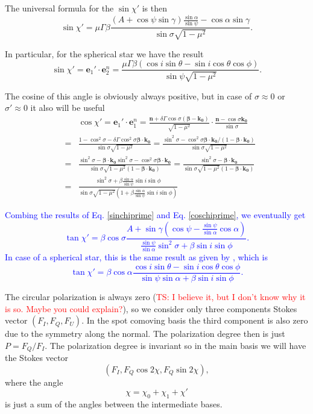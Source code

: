 \documentclass{aa}
\newcommand{\be}{\begin{equation}}
\newcommand{\ee}{\end{equation}}
\def\beq{\begin{eqnarray}}
\def\eeq{\end{eqnarray}}
\newcommand{\red}[1]{\textcolor{red}{#1}}
\newcommand{\blue}[1]{\textcolor{blue}{#1}}
\begin{document}
The universal formula for the $\sin\chi'$ is then 
\be\label{sinchiprime}
\sin\chi'={\mu\Gamma\beta }\frac{(A+\cos\psi \sin\gamma)\frac{\sin\alpha}{\sin\psi} - \cos \alpha\sin\gamma}{\sin{\sigma}\sqrt{1-\mu^2} }.
\ee
      
In particular, for the spherical star we have the result 
\be\label{chiprimespherical}
\sin{\chi'}=\bm{e}_1'\cdot \bm{e}_2^n =
\frac{\mu\Gamma\beta (\cos i \sin \theta - \sin i \cos \theta \cos \phi)}{\sin{\psi}\sqrt{1-\mu^2} }.
\ee

The cosine of this angle is obviously always positive, but in case of $\sigma\approx0$ or $ \sigma'\approx0$ it also will be useful  
\beq\label{coschiprime}
&&\cos\chi'=\bm{e}_1'\cdot \bm{e}_1^n =\frac{\bm n + \delta  \Gamma \cos\sigma (\bm \beta - \bm{k_0} ) }{\sqrt{1-\mu^2} }\cdot 
\frac{\bm n - \cos \sigma  \bm{k_0} }{\sin{\sigma}} \nonumber \\
&=& \frac{1-\cos^2\sigma-\delta \Gamma \cos^2 \sigma \bm \beta \cdot \bm{k_0} }{\sin{\sigma}\sqrt{1-\mu^2} } 
=\frac{\sin^2\sigma-  \cos^2 \sigma \bm \beta \cdot \bm{k_0} /(1-\bm \beta \cdot \bm{k_0}) }{\sin{\sigma}\sqrt{1-\mu^2} } \nonumber \\ 
&=&\frac{\sin^2\sigma -\bm \beta \cdot \bm{k_0} \sin^2\sigma - \cos^2 \sigma \bm \beta \cdot \bm{k_0} }{\sin{\sigma}\sqrt{1-\mu^2} (1-\bm \beta \cdot \bm{k_0}) } 
=\frac{\sin^2\sigma -\bm \beta \cdot \bm{k_0}  }{\sin{\sigma}\sqrt{1-\mu^2} (1-\bm \beta \cdot \bm{k_0}) } \nonumber \\
&=&\frac{\sin^2\sigma + \beta \frac{\sin \alpha }{\sin\psi} \sin i \sin \phi }{\sin{\sigma}\sqrt{1-\mu^2} (1+ \beta \frac{\sin \alpha }{\sin\psi} \sin i \sin \phi) } 
\eeq		

\blue{
Combing the results of Eq. \eqref{sinchiprime} and Eq. \eqref{coschiprime}, we eventually get 
\be
\tan\chi' = \beta \cos \sigma \frac{A + \sin \gamma (\cos \psi - \frac{\sin \psi}{\sin \alpha}\cos \alpha)}{\frac{\sin \psi}{\sin \alpha}\sin^{2}\sigma + \beta \sin i \sin \phi}.
\ee
In case of a spherical star, this is the same result as given by \citet{VP04}, which is
\be
\tan\chi' = \beta \cos \alpha \frac{\cos i \sin \theta - \sin i \cos \theta \cos \phi}{\sin \psi\sin\alpha + \beta \sin i \sin \phi}.
\ee
}


The circular polarization is always zero (\red{TS: I believe it, but I don't know why it is so. Maybe you could explain?}), so we consider only three components Stokes vector $(F_I,F_Q,F_U)$.
In the spot comoving basis the third component is also zero due to the symmetry along the normal.
The polarization degree then is just $P=F_Q/F_I$.
The polarization degree is invariant so in the main basis we will have the Stokes vector
\be
(F_I, F_Q \cos{2\chi},F_Q \sin{2\chi}),
\ee
where the angle
\be
\chi=\chi_0+\chi_1+ \chi'\ee
is just a sum of the angles between the intermediate bases.
\end{document}
